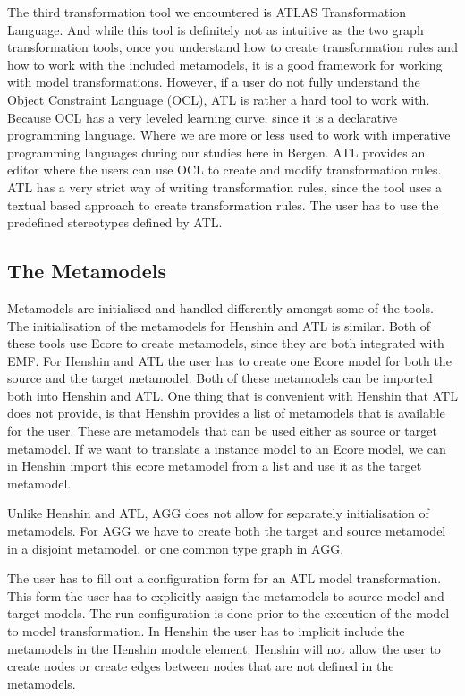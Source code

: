 The third transformation tool we encountered is ATLAS Transformation Language.
And while this tool is definitely not as intuitive as the two graph
transformation tools, once you understand how to create transformation rules
and how to work with the included metamodels, it is a good framework for
working with model transformations. However, if a user do not fully understand
the Object Constraint Language (OCL), ATL is rather a hard tool to work with.
Because OCL has a very leveled learning curve, since it is a declarative
programming language. Where we are more or less used to work with imperative
programming languages during our studies here in Bergen. ATL provides an editor
where the users can use OCL to create and modify transformation rules. ATL has
a very strict way of writing transformation rules, since the tool uses a
textual based approach to create transformation rules. The user has to use the
predefined stereotypes defined by ATL.

\subsection{The Metamodels}
Metamodels are initialised and handled differently amongst some of the tools.
The initialisation of the metamodels for Henshin and ATL is similar. Both of
these tools use Ecore to create metamodels, since they are both integrated with
EMF. For Henshin and ATL the user has to create one Ecore model for both the
source and the target metamodel. Both of these metamodels can be imported both
into Henshin and ATL. One thing that is convenient with Henshin that ATL does
not provide, is that Henshin provides a list of metamodels that is available
for the user. These are metamodels that can be used either as source or target
metamodel. If we want to translate a instance model to an Ecore model, we can
in Henshin import this ecore metamodel from a list and use it as the target metamodel.

Unlike Henshin and ATL, AGG does not allow for separately initialisation of
metamodels. For AGG we have to create both the target and source metamodel in a
disjoint metamodel, or one common type graph in AGG.

The user has to fill out a configuration form for an ATL model transformation.
This form the user has to explicitly assign the metamodels to source model and
target models. The run configuration is done prior to the execution of the model
to model transformation. In Henshin the user has to implicit include the
metamodels in the Henshin module element. Henshin will not allow the user to
create nodes or create edges between nodes that are not defined in the
metamodels. 

